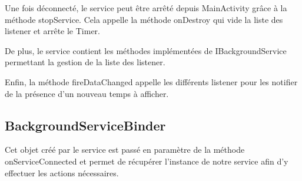 \documentclass{report}
\begin{document}
			Une fois déconnecté, le service peut être arrêté depuis MainActivity grâce à la méthode stopService.
			Cela appelle la méthode onDestroy qui vide la liste des listener et arrête le Timer. 

			De plus, le service contient les méthodes implémentées de IBackgroundService permettant la gestion de la liste des listener.

			Enfin, la méthode fireDataChanged appelle les différents listener pour les notifier de la présence d'un nouveau temps à afficher.
		
		\subsection{BackgroundServiceBinder}
			Cet objet créé par le service est passé en paramètre de la méthode onServiceConnected et permet de récupérer l'instance de notre service afin d'y effectuer les actions nécessaires.
				
\end{document}
